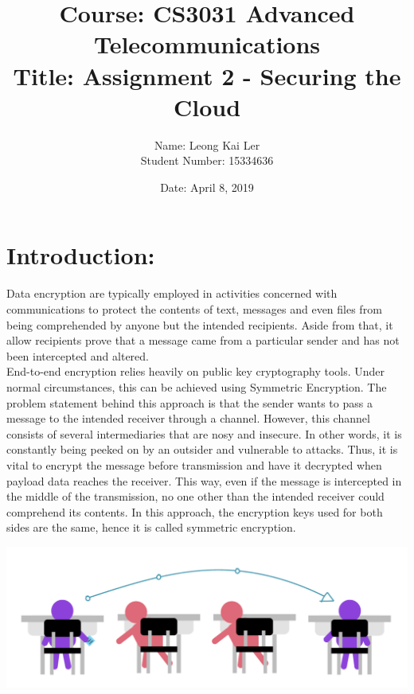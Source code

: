 \documentclass[12pt]{article}
\makeatletter
\renewcommand{\maketitle}{\bgroup\setlength{\parindent}{0pt}
\begin{flushleft}
  \textbf{\@title}

  \@author
  \@date
\end{flushleft}\egroup
}
\makeatother
\begin{document}
\title{\large Course: CS3031 Advanced Telecommunications \\ \normalsize Title: Assignment 2 - Securing the Cloud }
\author{Name: Leong Kai Ler \\ Student Number: 15334636 \\   }
\date{Date: April 8, 2019}
\maketitle

\section*{Introduction:}
Data encryption are typically employed in activities concerned with communications to protect the contents of text, messages and even files from being comprehended by anyone but the intended recipients. Aside from that, it allow recipients prove that a message came from a particular sender and has not been intercepted and altered.   \\

End-to-end encryption relies heavily on public key cryptography tools. Under normal circumstances, this can be achieved using Symmetric Encryption. The problem statement  behind this approach is that the sender wants to pass a message to the intended receiver through a channel. However, this channel consists of several intermediaries that are nosy and insecure. In other words, it is constantly being peeked on by an outsider and vulnerable to attacks. Thus, it is vital to encrypt the message before transmission and have it decrypted when payload data reaches the receiver. This way, even if the message is intercepted in the middle of the transmission, no one other than the intended receiver could comprehend its contents. In this approach, the encryption keys used for both sides are the same, hence it is called symmetric encryption. \\ 

\begin{center}
\includegraphics[scale=0.5]{normal}
\end{center}
\end{document}
